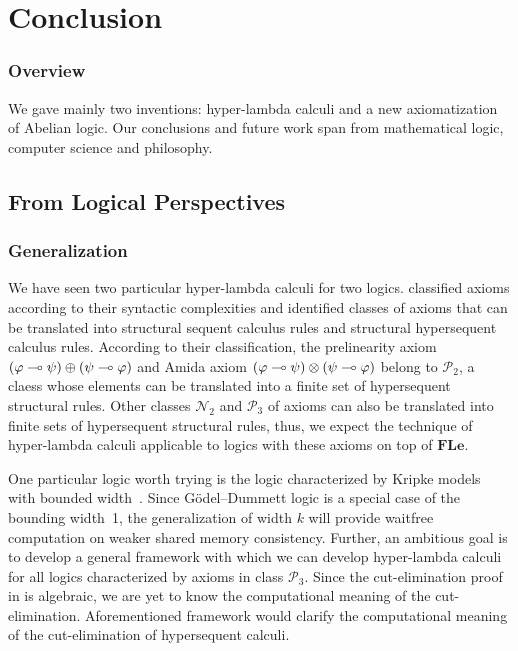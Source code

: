 \chapter{Conclusion}

\subsection{Overview}

We gave mainly two inventions: hyper-lambda calculi and a new
axiomatization of Abelian logic.
Our conclusions and future work span from mathematical logic, computer
science and philosophy.

\section{From Logical Perspectives}

\subsection{Generalization}

We have seen two particular hyper-lambda calculi for two logics.
\citet{alg} classified axioms according to their syntactic complexities
and identified classes of axioms that can be translated into structural
sequent calculus rules and structural hypersequent calculus rules.
According to their classification, the prelinearity axiom
$(\varphi\multimap\psi)\oplus(\psi\multimap\varphi)$ and Amida axiom
$(\varphi\multimap\psi)\otimes(\psi\multimap\varphi)$ belong to $\mathcal P_2$, a
claess whose elements can be translated into a finite set of
hypersequent structural rules.
Other classes $\mathcal N_2$ and $\mathcal P_3$ of axioms can also be
translated into finite sets of hypersequent structural rules,
thus, we expect the technique of hyper-lambda calculi applicable to
logics with these axioms on top of $\mathbf{FLe}$.

One particular logic worth trying is
the logic characterized by Kripke models with bounded width~\citep{Ciabattoni01042001}.
Since G\"odel--Dummett logic is a special case of the bounding width~1,
the generalization of width $k$ will provide waitfree computation on
weaker shared memory consistency.  Further,
an ambitious goal is to develop a general framework with which we can
develop hyper-lambda calculi for all logics characterized by axioms in
class $\mathcal P_3$.
Since the cut-elimination proof in \citep{alg} is algebraic,
we are yet to know the computational meaning of the cut-elimination.
Aforementioned framework would clarify the computational meaning of the
cut-elimination of hypersequent calculi.

